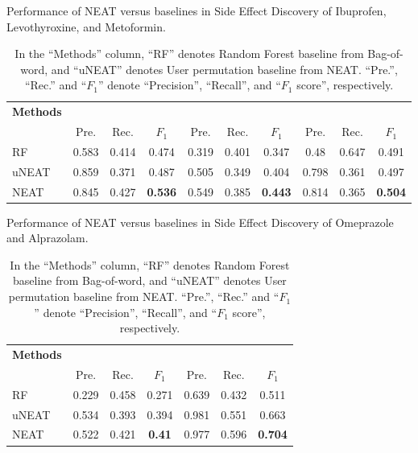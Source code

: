 \documentclass{bmcart}
\begin{document}
\begin{backmatter}
\begin{table}[h!]
  \label{table:credibility}
\end{table}
\begin{table}[h!]
  \caption{Performance of NEAT versus baselines in Side Effect Discovery of Ibuprofen, Levothyroxine, and Metoformin.}
  \scalebox{1.2}
  \footnotesize
  \begin{tabular}{l|c c c|c c c|c c c}
    \hline
    \textbf{Methods}& 
    \multicolumn{3}{c|}{\centering{Ibuprofen}} & \multicolumn{3}{c|}{\centering{Levothyroxine}} & \multicolumn{3}{c}{\centering{Metoformin}}\\
    & Pre. & Rec. & $F_1$ & Pre. & Rec. & $F_1$ & Pre. & Rec. & $F_1$ \\ \hline
    RF & 0.583 & 0.414 & 0.474 & 0.319 & 0.401 & 0.347 & 0.48 & 0.647 & 0.491 \\
    uNEAT & 0.859 & 0.371 & 0.487 & 0.505 & 0.349 & 0.404 & 0.798 & 0.361 & 0.497 \\
    NEAT & 0.845 & 0.427 & \textbf{0.536} & 0.549 & 0.385 & \textbf{0.443} & 0.814 & 0.365 & \textbf{0.504} \\ \hline
  \end{tabular}
  \caption*{In the ``Methods'' column, ``RF'' denotes Random Forest baseline from Bag-of-word, and ``uNEAT'' denotes User permutation baseline from NEAT. ``Pre.'', ``Rec.'' and ``$F_1$'' denote ``Precision'', ``Recall'', and ``$F_1$ score'', respectively.}
  \label{table:se_discovery1}
\end{table}
\begin{table}[h!]
  \caption{Performance of NEAT versus baselines in Side Effect Discovery of Omeprazole and Alprazolam.}
  \scalebox{1.2}
  \footnotesize
  \begin{tabular}{l|c c c|c c c}
    \hline
    \textbf{Methods} &
    \multicolumn{3}{c|}{\centering{Omeprazole}} &
    \multicolumn{3}{c}{\centering{Alprazolam}}\\
    & Pre. & Rec. & $F_1$ & Pre. & Rec. & $F_1$ \\ \hline
    RF & 0.229 & 0.458 & 0.271 & 0.639 & 0.432 & 0.511 \\
    uNEAT & 0.534 & 0.393 & 0.394 & 0.981 & 0.551 & 0.663 \\
    NEAT & 0.522 & 0.421 & \textbf{0.41} & 0.977 & 0.596 & \textbf{0.704} \\ \hline
  \end{tabular}
  \caption*{In the ``Methods'' column, ``RF'' denotes Random Forest baseline from Bag-of-word, and ``uNEAT'' denotes User permutation baseline from NEAT. ``Pre.'', ``Rec.'' and ``$F_1$'' denote ``Precision'', ``Recall'', and ``$F_1$ score'', respectively.}

\end{table}
\end{backmatter}
\end{document}
